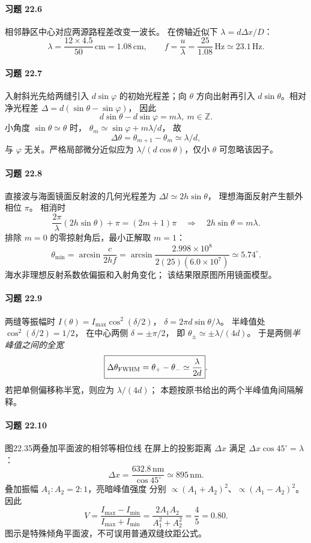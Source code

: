 \paragraph{习题 22.6}
相邻静区中心对应两源路程差改变一波长。
在傍轴近似下 \(\lambda=d\Delta x/D\)：
\[
\lambda=\frac{12\times4.5}{50}\,\mathrm{cm}=1.08\,\mathrm{cm},
\qquad
\boxed{f=\frac{u}{\lambda}
=\frac{25}{1.08}\,\mathrm{Hz}
\simeq23.1\,\mathrm{Hz}}.
\]

\paragraph{习题 22.7}
入射斜光先给两缝引入 \(d\sin\varphi\)
的初始光程差；向 \(\theta\) 方向出射再引入
\(d\sin\theta\)。相对净光程差
\(\Delta=d(\sin\theta-\sin\varphi)\)，
因此
\[
\boxed{d\sin\theta-d\sin\varphi=m\lambda,\ m\in\mathbb Z}.
\]
小角度 \(\sin\theta\simeq\theta\) 时，
\(\theta_m\simeq\sin\varphi+m\lambda/d\)，
故
\[
\boxed{\Delta\theta=\theta_{m+1}-\theta_m\simeq\lambda/d},
\]
与 \(\varphi\) 无关。严格局部微分近似应为
\(\lambda/(d\cos\theta)\)，仅小 \(\theta\) 可忽略该因子。

\paragraph{习题 22.8}
直接波与海面镜面反射波的几何光程差为
\(\Delta l\simeq2h\sin\theta\)，
理想海面反射产生额外相位 \(\pi\)。
相消时
\[
\frac{2\pi}{\lambda}(2h\sin\theta)+\pi
=(2m+1)\pi
\quad\Longrightarrow\quad
2h\sin\theta=m\lambda.
\]
排除 \(m=0\) 的零掠射角后，最小正解取 \(m=1\)：
\[
\boxed{\theta_{\min}=\arcsin\frac{c}{2hf}
=\arcsin\frac{2.998\times10^8}{2(25)(6.0\times10^7)}
\simeq5.74^\circ}.
\]
海水非理想反射系数依偏振和入射角变化；
该结果限原图所用镜面模型。

\paragraph{习题 22.9}
两缝等振幅时
\(I(\theta)=I_{\max}\cos^2(\delta/2)\)，
\(\delta=2\pi d\sin\theta/\lambda\)。
半峰值处 \(\cos^2(\delta/2)=1/2\)，
在中心两侧 \(\delta=\pm\pi/2\)，
即 \(\theta_{\pm}\simeq\pm\lambda/(4d)\)。
于是两侧\emph{半峰值之间的全宽}
\[
\boxed{\Delta\theta_{\rm FWHM}
=\theta_+-\theta_-\simeq\frac{\lambda}{2d}}.
\]
若把单侧偏移称半宽，则应为 \(\lambda/(4d)\)；
本题按原书给出的两个半峰值角间隔解释。

\paragraph{习题 22.10}
图22.35两叠加平面波的相邻等相位线
在屏上的投影距离 \(\Delta x\)
满足 \(\Delta x\cos45^\circ=\lambda\)：
\[
\boxed{\Delta x=\frac{632.8\,\mathrm{nm}}{\cos45^\circ}
\simeq895\,\mathrm{nm}}.
\]
叠加振幅 \(A_1:A_2=2:1\)，亮暗峰值强度
分别 \(\propto(A_1+A_2)^2\)、\(\propto(A_1-A_2)^2\)。
因此
\[
\boxed{V=\frac{I_{\max}-I_{\min}}{I_{\max}+I_{\min}}
=\frac{2A_1A_2}{A_1^2+A_2^2}
=\frac45=0.80}.
\]
图示是特殊倾角平面波，不可误用普通双缝纹距公式。

